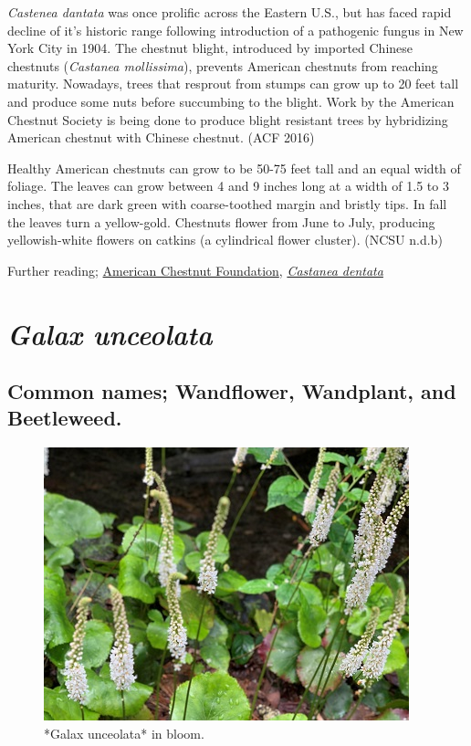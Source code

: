 \documentclass[
]{article}
\begin{document}
\emph{Castenea dantata} was once prolific across the Eastern U.S., but has faced rapid decline of it's historic range following introduction of a pathogenic fungus in New York City in 1904. The chestnut blight, introduced by imported Chinese chestnuts (\emph{Castanea mollissima}), prevents American chestnuts from reaching maturity. Nowadays, trees that resprout from stumps can grow up to 20 feet tall and produce some nuts before succumbing to the blight. Work by the American Chestnut Society is being done to produce blight resistant trees by hybridizing American chestnut with Chinese chestnut. (ACF 2016)

Healthy American chestnuts can grow to be 50-75 feet tall and an equal width of foliage. The leaves can grow between 4 and 9 inches long at a width of 1.5 to 3 inches, that are dark green with coarse-toothed margin and bristly tips. In fall the leaves turn a yellow-gold. Chestnuts flower from June to July, producing yellowish-white flowers on catkins (a cylindrical flower cluster). (NCSU n.d.b)

Further reading; \href{https://acf.org}{American Chestnut Foundation}, \href{https://plants.ces.ncsu.edu/plants/castanea-dentata/}{\emph{Castanea dentata}}

\hypertarget{galax-unceolata}{%
\section{\texorpdfstring{\emph{Galax unceolata}}{Galax unceolata}}\label{galax-unceolata}}

\hypertarget{common-names-wandflower-wandplant-and-beetleweed.}{%
\subsection{Common names; Wandflower, Wandplant, and Beetleweed.}\label{common-names-wandflower-wandplant-and-beetleweed.}}

\begin{figure}

{\centering \includegraphics[width=0.5\linewidth]{galax1} 

}

\caption{*Galax unceolata* in bloom.}\label{fig:galax1}
\end{figure}
\end{document}
